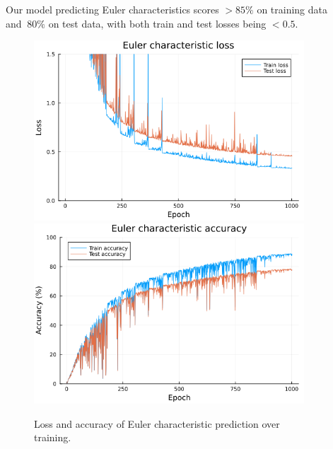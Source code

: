 \documentclass[final,20pt]{beamer}
\newlength{\sepwidth}
\newlength{\colwidth}
\newcommand{\separatorcolumn}{\begin{column}{\sepwidth}\end{column}}
\begin{document}
\begin{frame}[t, fragile]
\begin{columns}[t]
\begin{column}{\colwidth}
\end{column}

\separatorcolumn

\begin{column}{\colwidth}
  \begin{block}

    Our model predicting Euler characteristics scores
    $>85\%$ on training data and $~80\%$ on test data,
    with both train and test losses being $<0.5$.

    \begin{figure}
    \includegraphics{chi-loss.png}
    \includegraphics{chi-accuracy.png}
    \caption{Loss and accuracy of Euler characteristic prediction over training.}
    \end{figure}

    \end{block}


\end{column}
\end{columns}
\end{frame}
\end{document}
